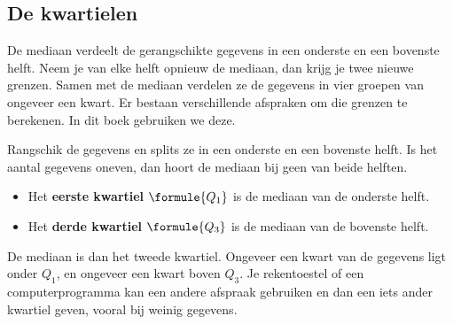 \begin{oefeningen}
\end{oefeningen}

\subsection{De kwartielen}

De mediaan verdeelt de gerangschikte gegevens in een onderste en een bovenste helft. Neem je van elke helft opnieuw de mediaan, dan krijg je twee nieuwe grenzen. Samen met de mediaan verdelen ze de gegevens in vier groepen van ongeveer een kwart. Er bestaan verschillende afspraken om die grenzen te berekenen. In dit boek gebruiken we deze.

\begin{theorie}
Rangschik de gegevens en splits ze in een onderste en een bovenste helft. Is het aantal gegevens oneven, dan hoort de mediaan bij geen van beide helften.
\begin{itemize}
  \item Het \textbf{\textcolor{accent}{eerste kwartiel}} $\formule{Q_1}$ is de mediaan van de onderste helft.
  \item Het \textbf{\textcolor{accent}{derde kwartiel}} $\formule{Q_3}$ is de mediaan van de bovenste helft.
\end{itemize}
\end{theorie}

De mediaan is dan het tweede kwartiel. Ongeveer een kwart van de gegevens ligt onder $Q_1$, en ongeveer een kwart boven $Q_3$. Je rekentoestel of een computerprogramma kan een andere afspraak gebruiken en dan een iets ander kwartiel geven, vooral bij weinig gegevens.



